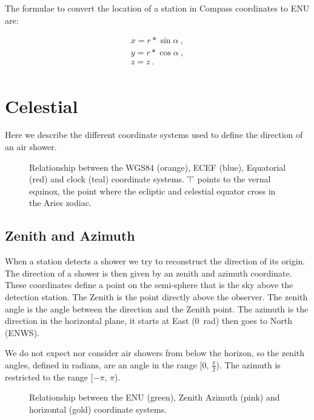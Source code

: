 The formulae to convert the location of a station in Compass coordinates
to ENU are:

\begin{equation}
    \begin{array}{l}
        x = r * \sin{\alpha} \ , \\
        y = r * \cos{\alpha} \ , \\
        z = z \ . \\
    \end{array}
\end{equation}


\section{Celestial}

Here we describe the different coordinate systems used to define the
direction of an air shower.

\begin{figure}
    \centering
    
    \caption{Relationship between the WGS84 (orange), ECEF (blue),
             Equatorial (red) and clock (teal) coordinate systems.
             $\vernal$ points to the vernal equinox, the point where the
             ecliptic and celestial equator cross in the Aries zodiac.}
    \label{fig:wgs84_equatorial}
\end{figure}


\subsection{Zenith and Azimuth}

When a station detects a shower we try to reconstruct the direction of
its origin. The direction of a shower is then given by an zenith and
azimuth coordinate. These coordinates define a point on the semi-sphere
that is the sky above the detection station. The Zenith is the point
directly above the observer. The zenith angle is the angle between the
direction and the Zenith point. The azimuth is the direction in the
horizontal plane, it starts at East (\SI{0}{\radian}) then goes to North
(ENWS).

We do not expect nor consider air showers from below the horizon, so the
zenith angles, defined in radians, are an angle in the range [0,
$\frac{\pi}{2}$). The azimuth is restricted to the range [$-\pi$, $\pi$).

\begin{figure}
    \centering
    
    \caption{Relationship between the ENU (green), Zenith Azimuth (pink)
             and horizontal (gold) coordinate systems.}
    \label{fig:enu_horizontal}
\end{figure}


